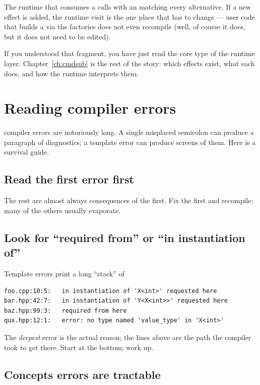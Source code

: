 The runtime that consumes a  calls  with
an  matching every alternative. If a new effect is
added, the runtime visit is the one place that has to change ---
user code that builds a  via the factories does not even
recompile (well, of course it does, but it does not need to be
edited).

If you understood that fragment, you have just read the core type
of the runtime layer. Chapter~\ref{ch:cmdsub} is the rest of the
story: which effects exist, what each does, and how the runtime
interprets them.

\section{Reading compiler errors}
\label{sec:cpp:errors}

\cpp{} compiler errors are notoriously long. A single misplaced
semicolon can produce a paragraph of diagnostics; a template error
can produce screens of them. Here is a survival guide.

\subsection{Read the first error first}

The rest are almost always consequences of the first. Fix the first
and recompile; many of the others usually evaporate.

\subsection{Look for ``required from'' or ``in instantiation of''}

Template errors print a long ``stack'' of

\begin{lstlisting}[style=shell]
foo.cpp:10:5:   in instantiation of 'X<int>' requested here
bar.hpp:42:7:   in instantiation of 'Y<X<int>>' requested here
baz.hpp:99:3:   required from here
qux.hpp:12:1:   error: no type named 'value_type' in 'X<int>'
\end{lstlisting}

The \emph{deepest} error is the actual reason; the lines above are
the path the compiler took to get there. Start at the bottom; work
up.

\subsection{Concepts errors are tractable}

